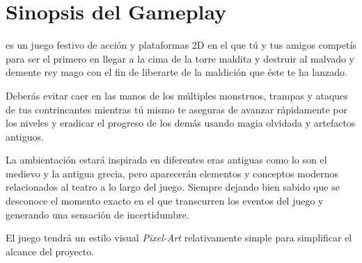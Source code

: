 \section{Sinopsis del Gameplay}%



\emph{\izenburua } es un juego festivo de acción y plataformas 2D en el que tú y
tus amigos competís para ser el primero en llegar a la cima de la torre maldita
y destruir al malvado y demente rey mago con el fin de liberarte de la maldición
que éste te ha lanzado.




Deberás evitar caer en las manos de los múltiples monstruos, trampas y ataques
de tus contrincantes mientras tú mismo te aseguras de avanzar rápidamente por
los niveles y eradicar el progreso de los demás usando magia olvidada y
artefactos antiguos.


La ambientación estará inspirada en diferentes eras antiguas como lo son el
medievo y la antigua grecia, pero aparecerán elementos y conceptos modernos
relacionados al teatro a lo largo del juego. Siempre dejando bien sabido que se
desconoce el momento exacto en el que transcurren los eventos del juego y
generando una sensación de incertidumbre.


El juego tendrá un estilo visual \emph{Pixel-Art} relativamente simple para
simplificar el alcance del proyecto.